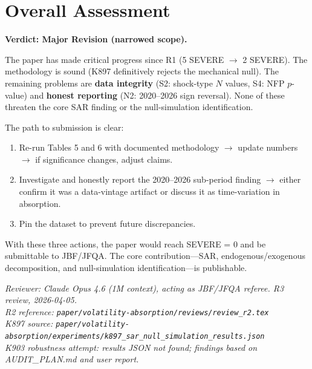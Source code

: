 \documentclass[12pt,a4paper]{article}
\begin{document}
\bigskip

\section*{Overall Assessment}

\textbf{Verdict: Major Revision (narrowed scope).}

The paper has made critical progress since R1 (5 SEVERE $\to$ 2 SEVERE). The methodology is sound (K897 definitively rejects the mechanical null). The remaining problems are \textbf{data integrity} (S2: shock-type $N$ values, S4: NFP $p$-value) and \textbf{honest reporting} (N2: 2020--2026 sign reversal). None of these threaten the core SAR finding or the null-simulation identification.

The path to submission is clear:
\begin{enumerate}[nosep]
\item Re-run Tables 5 and 6 with documented methodology $\to$ update numbers $\to$ if significance changes, adjust claims.
\item Investigate and honestly report the 2020--2026 sub-period finding $\to$ either confirm it was a data-vintage artifact or discuss it as time-variation in absorption.
\item Pin the dataset to prevent future discrepancies.
\end{enumerate}

With these three actions, the paper would reach SEVERE = 0 and be submittable to JBF/JFQA. The core contribution---SAR, endogenous/exogenous decomposition, and null-simulation identification---is publishable.

\bigskip

\noindent\textit{Reviewer: Claude Opus 4.6 (1M context), acting as JBF/JFQA referee. R3 review, 2026-04-05.}\\
\noindent\textit{R2 reference: \texttt{paper/volatility-absorption/reviews/review\_r2.tex}}\\
\noindent\textit{K897 source: \texttt{paper/volatility-absorption/experiments/k897\_sar\_null\_simulation\_results.json}}\\
\noindent\textit{K903 robustness attempt: results JSON not found; findings based on AUDIT\_PLAN.md and user report.}
\end{document}
